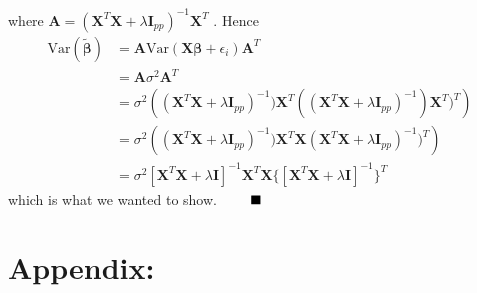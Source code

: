 \documentclass[12pt,
               a4paper,
               article,
               oneside,
               norsk,oldfontcommands]{memoir}
\newcommand{\Q}{ \qquad \hfill \blacksquare}
\begin{document}
where $\mathbf{A} = (\mathbf{X}^{T} \mathbf{X} + \lambda \mathbf{I}_{pp})^{-1} \mathbf{X}^{T}$ . Hence 
\begin{align}
\text{Var}( \tilde{\boldsymbol{\beta}}) &=  \mathbf{A} \text{Var}(\mathbf{X} \boldsymbol{\beta} + \epsilon_{i}) \mathbf{A}^T  \\[5pt]
&=  \mathbf{A} \sigma^2 \mathbf{A}^T \label{eq5} \\[5pt]
&= \sigma^2 \left( (\mathbf{X}^{T} \mathbf{X} + \lambda \mathbf{I}_{pp})^{-1})\mathbf{X}^{T} (( \mathbf{X}^{T} \mathbf{X} + \lambda \mathbf{I}_{pp})^{-1}) \mathbf{X}^{T})^T  \right) \\[5pt] 
&= \sigma^2 \left( (\mathbf{X}^{T} \mathbf{X} + \lambda \mathbf{I}_{pp})^{-1})\mathbf{X}^{T} \mathbf{X} ( \mathbf{X}^{T} \mathbf{X} + \lambda \mathbf{I}_{pp})^{-1})^T  \right)\label{eq3} \\[5pt]
&= \sigma^2[  \mathbf{X}^{T} \mathbf{X} + \lambda \mathbf{I} ]^{-1}  \mathbf{X}^{T}\mathbf{X} \{ [  \mathbf{X}^{T} \mathbf{X} + \lambda \mathbf{I} ]^{-1}\}^{T}
\end{align}
which is what we wanted to show. $\Q$
\appendix
\section*{\centering Appendix:}
\end{document}
